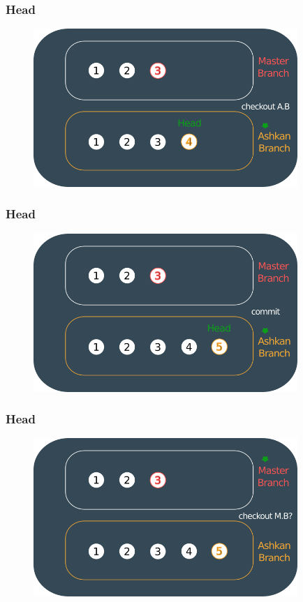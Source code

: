 \documentclass{beamer}
\begin{document}
	\begin{frame}
		\frametitle{Head}
		\begin{figure}[htbp]
			\centering
			\includegraphics[width=10cm]{head12}
		\end{figure}
	\end{frame}
	
	\begin{frame}
		\frametitle{Head}
		\begin{figure}[htbp]
			\centering
			\includegraphics[width=10cm]{head13}
		\end{figure}
	\end{frame}
	
	\begin{frame}
		\frametitle{Head}
		\begin{figure}[htbp]
			\centering
			\includegraphics[width=10cm]{head14}
		\end{figure}
	\end{frame}
	
\end{document}
